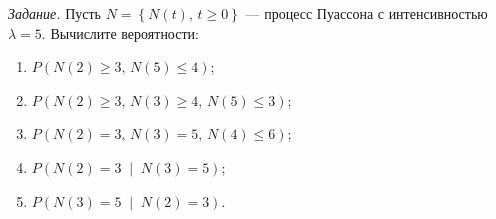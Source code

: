 \textit{Задание.}
Пусть $N = \left\{ N \left( t \right), \, t \geq 0 \right\} $ ---
процесс Пуассона с интенсивностью $ \lambda = 5$.
Вычислите вероятности:
\begin{enumerate}[label=\alph*)]
  \item $P \left( N \left( 2 \right) \geq 3, \, N \left( 5 \right) \leq 4 \right) $;
  \item $P \left(
    N \left( 2 \right) \geq 3, \, N \left( 3 \right) \geq 4, \, N \left( 5 \right) \leq 3 \right) $;
  \item $P \left(
    N \left( 2 \right) = 3, \, N \left( 3 \right) = 5, \, N \left( 4 \right) \leq 6 \right) $;
  \item $P \left( N \left( 2 \right) = 3 \; \middle| \; N \left( 3 \right) = 5 \right) $;
  \item $P \left( N \left( 3 \right) = 5 \; \middle| \; N \left( 2 \right) = 3 \right) $.
\end{enumerate}

